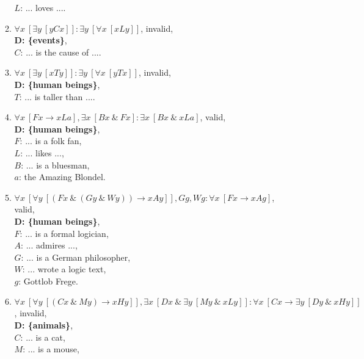 \documentclass[a4paper,12pt]{article}
\newcommand{\ra}{\rightarrow}
\newcommand{\ta}{ \ \& \ }
\newcommand{\all}{\forall}
\newcommand{\ex}{\exists}
\begin{document}
\begin{enumerate}[label=\arabic*,leftmargin=*]
\begin{enumerate}[label=(\roman*)]
                    $L$: ... loves ....
                \item $\all x \ [\ex y \ [yCx]]
                    : \ex y \ [\all x \ [xLy]]$,
                    invalid,\\
                    \textbf{D: \{events\}},\\
                    $C$: ... is the cause of ....
                \item $\all x \ [\ex y \ [xTy]]
                    : \ex y \ [\all x \ [yTx]]$,
                    invalid,\\
                    \textbf{D: \{human beings\}},\\
                    $T$: ... is taller than ....
                \item $\all x \ [Fx \ra xLa], \ex x \ [Bx \ta Fx]
                    : \ex x \ [Bx \ta xLa]$,
                    valid,\\
                    \textbf{D: \{human beings\}},\\
                    $F$: ... is a folk fan,\\
                    $L$: ... likes ...,\\
                    $B$: ... is a bluesman,\\
                    $a$: the Amazing Blondel.
                \item $\all x \ [\all y \ [(Fx \ta (Gy \ta Wy)) \ra xAy]],
                    Gg, Wg
                    : \all x \ [Fx \ra xAg]$,
                    valid,\\
                    \textbf{D: \{human beings\}},\\
                    $F$: ... is a formal logician,\\
                    $A$: ... admires ...,\\
                    $G$: ... is a German philosopher,\\
                    $W$: ... wrote a logic text,\\
                    $g$: Gottlob Frege.
                \item $\all x \ [\all y \ [(Cx \ta My) \ra xHy]],
                    \ex x \ [Dx \ta \ex y \ [My \ta xLy]]
                    : \all x \ [Cx \ra \ex y \ [Dy \ta xHy]]$,
                    invalid,\\
                    \textbf{D: \{animals\}},\\
                    $C$: ... is a cat,\\
                    $M$: ... is a mouse,\\

\end{enumerate}
\end{enumerate}
\end{document}
